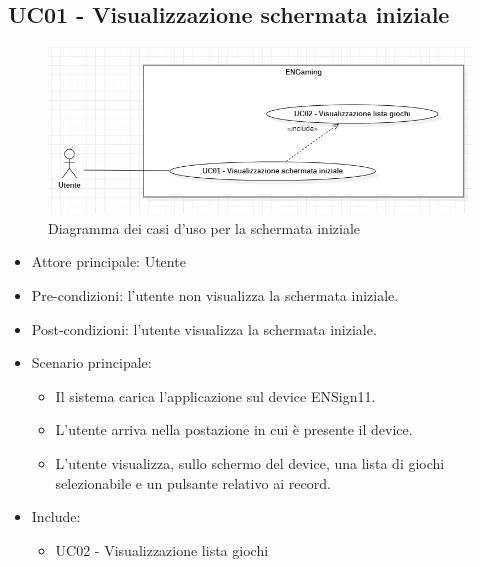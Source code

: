 \subsection{UC01 - Visualizzazione schermata iniziale}
\begin{figure}[h]
    \centering
    \includegraphics[width=400pt]{images/usecase/UC01.png}
    \caption{Diagramma dei casi d'uso per la schermata iniziale}
    \label{fig:UC01}
\end{figure}
\begin{itemize}
    \item Attore principale: Utente
    \item Pre-condizioni: l'utente non visualizza la schermata iniziale.
    \item Post-condizioni: l'utente visualizza la schermata iniziale.
    \item Scenario principale: \begin{itemize}
        \item Il sistema carica l'applicazione sul device ENSign11.
        \item L'utente arriva nella postazione in cui è presente il device.
        \item L'utente visualizza, sullo schermo del device, una lista di giochi selezionabile e un pulsante relativo ai record.
    \end{itemize}
    \item Include: \begin{itemize}
        \item UC02 - Visualizzazione lista giochi
    \end{itemize}
\end{itemize}
\newpage
